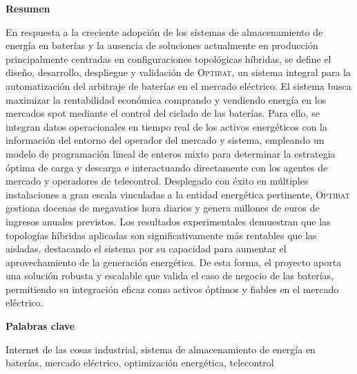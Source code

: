 \newpage

\thispagestyle{empty}

\begin{center}
  {\bf \huge Resumen}
\end{center}

\vspace{1cm}

En respuesta a la creciente adopción de los sistemas de almacenamiento de energía en baterías y la ausencia de soluciones actualmente en producción principalmente centradas en configuraciones topológicas híbridas, se define el diseño, desarrollo, despliegue y validación de \textsc{Optibat}, un sistema integral para la automatización del arbitraje de baterías en el mercado eléctrico. El sistema busca maximizar la rentabilidad económica comprando y vendiendo energía en los mercados spot mediante el control del ciclado de las baterías. Para ello, se integran datos operacionales en tiempo real de los activos energéticos con la información del entorno del operador del mercado y sistema, empleando un modelo de programación lineal de enteros mixto para determinar la estrategia óptima de carga y descarga e interactuando directamente con los agentes de mercado y operadores de telecontrol. Desplegado con éxito en múltiples instalaciones a gran escala vinculadas a la entidad energética pertinente, \textsc{Optibat} gestiona docenas de megavatios hora diarios y genera millones de euros de ingresos anuales previstos. Los resultados experimentales demuestran que las topologías híbridas aplicadas son significativamente más rentables que las aisladas, destacando el sistema por su capacidad para aumentar el aprovechamiento de la generación energética. De esta forma, el proyecto aporta una solución robusta y escalable que valida el caso de negocio de las baterías, permitiendo su integración eficaz como activos óptimos y fiables en el mercado eléctrico.

\vspace{1cm}

\begin{center}
  {\bf \large Palabras clave}
\end{center}

\vspace{0.5cm}

Internet de las cosas industrial, sistema de almacenamiento de energía en baterías, mercado eléctrico, optimización energética, telecontrol

\newpage

\thispagestyle{empty}

